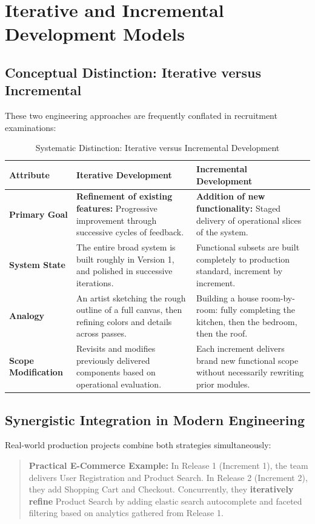 \section{Iterative and Incremental Development Models}
\label{sec:se_iterative_incremental}

\subsection{Conceptual Distinction: Iterative versus Incremental}
These two engineering approaches are frequently conflated in recruitment examinations:
\begin{table}[htbp]
\centering
\small
\caption{Systematic Distinction: Iterative versus Incremental Development}
\label{tab:iterative_vs_incremental}
\begin{tabularx}{\textwidth}{l p{5cm} X}
\toprule
\textbf{Attribute} & \textbf{Iterative Development} & \textbf{Incremental Development} \\
\midrule
\textbf{Primary Goal} & \textbf{Refinement of existing features:} Progressive improvement through successive cycles of feedback. & \textbf{Addition of new functionality:} Staged delivery of operational slices of the system. \\
\textbf{System State} & The entire broad system is built roughly in Version 1, and polished in successive iterations. & Functional subsets are built completely to production standard, increment by increment. \\
\textbf{Analogy} & An artist sketching the rough outline of a full canvas, then refining colors and details across passes. & Building a house room-by-room: fully completing the kitchen, then the bedroom, then the roof. \\
\textbf{Scope Modification} & Revisits and modifies previously delivered components based on operational evaluation. & Each increment delivers brand new functional scope without necessarily rewriting prior modules. \\
\bottomrule
\end{tabularx}
\end{table}

\subsection{Synergistic Integration in Modern Engineering}
Real-world production projects combine both strategies simultaneously:
\begin{quote}
\textbf{Practical E-Commerce Example:} In Release 1 (Increment 1), the team delivers User Registration and Product Search. In Release 2 (Increment 2), they add Shopping Cart and Checkout. Concurrently, they \textbf{iteratively refine} Product Search by adding elastic search autocomplete and faceted filtering based on analytics gathered from Release 1.
\end{quote}

